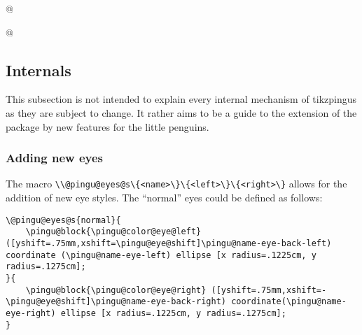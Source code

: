 \documentclass[parskip=half,english,numbers=noenddot,footnotes=nomultiple,oneside]{scrartcl}
\let\say\enquote
\def\ltex#1{\lstinline[style=lstpingu,language=pinguinternallang]'#1'}
\begin{document}
\begin{tcblisting}{@}
\begin{tikzpicture}
	\pingu[second shirt, second shirt raise=5mm]
\end{tikzpicture}
\end{tcblisting}
\endsubkeyexplain

{\def\pingu@color@secondshirt{<second-shirt-color>}
\begin{tcblisting}{@}
\begin{tikzpicture}
	\pingu[second shirt, second shirt neck=green]
\end{tikzpicture}
\end{tcblisting}
\endsubkeyexplain}

\subsection{Internals}
This subsection is not intended to explain every internal mechanism of tikzpingus as they are subject to change. It rather aims to be a guide to the extension of the package by new features for the little penguins.

\subsubsection{Adding new eyes}
The macro \ltex{\\@pingu@eyes@s\{<name>\}\{<left>\}\{<right>\}} allows for the addition of new eye styles.
The \say{normal} eyes could be defined as follows:
\begin{lstlisting}[style=lstpingu,language={pinguinternallang}]
\@pingu@eyes@s{normal}{
	\pingu@block{\pingu@color@eye@left} ([yshift=.75mm,xshift=\pingu@eye@shift]\pingu@name-eye-back-left) coordinate (\pingu@name-eye-left) ellipse [x radius=.1225cm, y radius=.1275cm];
}{
	\pingu@block{\pingu@color@eye@right} ([yshift=.75mm,xshift=-\pingu@eye@shift]\pingu@name-eye-back-right) coordinate(\pingu@name-eye-right) ellipse [x radius=.1225cm, y radius=.1275cm];
}
\end{lstlisting}
\printindex
\end{document}
